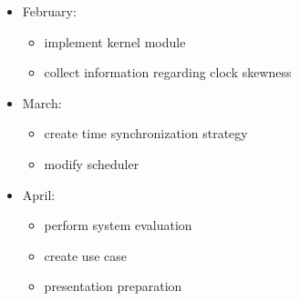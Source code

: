 \begin{itemize}
\item February:
\begin{itemize}
  \item implement kernel module
  \item collect information regarding clock skewness
\end{itemize}

\item March:
\begin{itemize}
  \item create time synchronization strategy
  \item modify scheduler
\end{itemize}

\item April:
\begin{itemize}
  \item perform system evaluation
  \item create use case
  \item presentation preparation
\end{itemize}

\end{itemize}


